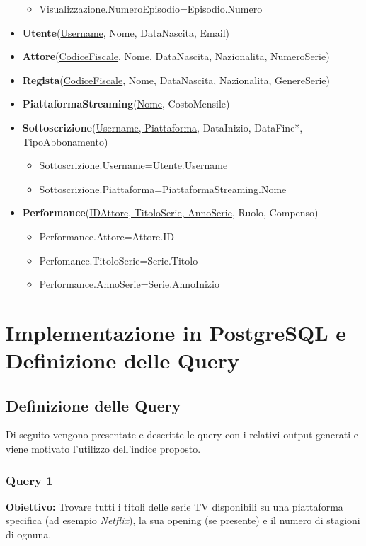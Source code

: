 \documentclass[10pt,a4paper]{article}
\begin{document}
\begin{itemize}
\begin{itemize}
        \item Visualizzazione.NumeroEpisodio=Episodio.Numero
    \end{itemize}
    \item \textbf{Utente}(\underline{Username}, Nome, DataNascita, Email)
    \item \textbf{Attore}(\underline{CodiceFiscale}, Nome, DataNascita, Nazionalita, NumeroSerie)
    \item \textbf{Regista}(\underline{CodiceFiscale}, Nome, DataNascita, Nazionalita, GenereSerie)
    \item \textbf{PiattaformaStreaming}(\underline{Nome}, CostoMensile)
    \item \textbf{Sottoscrizione}(\underline{Username, Piattaforma}, DataInizio, DataFine*, TipoAbbonamento)
    \begin{itemize}
        \item Sottoscrizione.Username=Utente.Username
        \item Sottoscrizione.Piattaforma=PiattaformaStreaming.Nome
    \end{itemize}
    \item \textbf{Performance}(\underline{IDAttore, TitoloSerie, AnnoSerie}, Ruolo, Compenso)
    \begin{itemize}
        \item Performance.Attore=Attore.ID
        \item Perfomance.TitoloSerie=Serie.Titolo
        \item Performance.AnnoSerie=Serie.AnnoInizio
    \end{itemize}
\end{itemize}


\section{Implementazione in PostgreSQL e Definizione delle Query}

\subsection*{Definizione delle Query}

Di seguito vengono presentate e descritte le query con i relativi output generati e 
viene motivato l’utilizzo dell’indice proposto.

\vspace{1cm}

\subsubsection*{Query 1}
\textbf{Obiettivo:} Trovare tutti i titoli delle serie TV disponibili su una piattaforma specifica (ad esempio \textit{Netflix}), la sua opening (se presente) e il numero di stagioni di ognuna.
\end{document}
